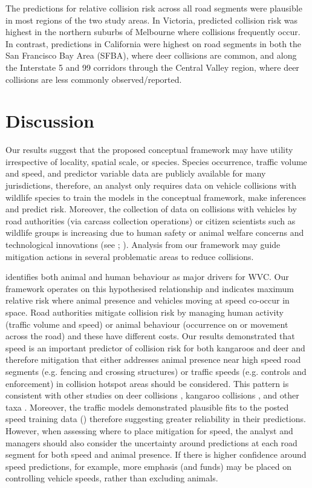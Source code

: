The predictions for relative collision risk across all road segments were plausible in most regions of the two study areas.  In Victoria, predicted collision risk was highest in the northern suburbs of Melbourne where collisions frequently occur. In contrast, predictions in California were highest on road segments in both the San Francisco Bay Area (SFBA), where deer collisions are common, and along the Interstate 5 and 99 corridors through the Central Valley region, where deer collisions are less commonly observed/reported.

\section{Discussion}

Our results suggest that the proposed conceptual framework may have utility irrespective of locality, spatial scale, or species.  Species occurrence, traffic volume and speed, and  predictor variable data are publicly available for many jurisdictions, therefore, an analyst only requires data on vehicle collisions with wildlife species to train the models in the conceptual framework, make inferences and predict risk.  Moreover, the collection of data on collisions with vehicles by road authorities (via carcass collection operations) or citizen scientists such as wildlife groups is increasing due to human safety or animal welfare concerns and technological innovations (see \cite{olso14}; \cite{shil15b}).  Analysis from our framework may guide mitigation actions in several problematic areas to reduce collisions.

\cite{form03} identifies both animal and human behaviour as major drivers for WVC.  Our framework operates on this hypothesised relationship and indicates maximum relative risk where animal presence and vehicles moving at speed co-occur in space.  Road authorities mitigate collision risk by managing human activity (traffic volume and speed) or animal behaviour (occurrence on or movement across the road) and these have different costs.  Our results demonstrated that speed is an important predictor of collision risk for both kangaroos and deer and therefore mitigation that either addresses animal presence near high speed road segments (e.g. fencing and crossing structures) or traffic speeds (e.g. controls and enforcement) in collision hotspot areas should be considered.  This pattern is consistent with other studies on deer collisions \citep{gkri13,meis14,sudh09}, kangaroo collisions \citep{rowd08}, and other taxa \citep{guns11}.  Moreover, the traffic models demonstrated plausible fits to the posted speed training data () therefore suggesting greater reliability in their predictions.  However, when assessing where to place mitigation for speed, the analyst and managers should also consider the uncertainty around predictions at each road segment for both speed and animal presence. If there is higher confidence around speed predictions, for example, more emphasis (and funds) may be placed on controlling vehicle speeds, rather than excluding animals.

